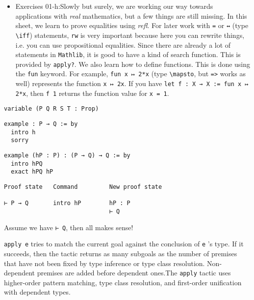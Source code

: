 \documentclass{memoir}
\begin{document}
\begin{itemize}
\item Exercises 01-h:Slowly but surely, we are working our way towards applications with \emph{real} mathematics, but a few things are still missing. In this sheet, we learn to prove equalities using \emph{refl}. For later work with \Verb|=| or \Verb|↔| (type \Verb|\iff|) statements, \Verb|rw| is very important because here you can rewrite things, i.e. you can use propositional equalities. Since there are already a lot of statements in \Verb|Mathlib|, it is good to have a kind of search function. This is provided by \Verb|apply?|. We also learn how to define functions. This is done using the \Verb|fun| keyword. For example, \Verb|fun x ↦ 2*x| (type \Verb|\mapsto|, but \Verb|=>| works as well) represents the function \Verb|x ↦ 2x|. If you have \Verb|let f : X → X := fun x ↦ 2*x|, then \Verb|f 1| returns the function value for \Verb|x = 1|.
\end{itemize}


\begin{verbatim}
variable (P Q R S T : Prop)

\end{verbatim}



\begin{verbatim}
example : P → Q := by
  intro h
  sorry

\end{verbatim}



\begin{verbatim}
example (hP : P) : (P → Q) → Q := by
  intro hPQ
  exact hPQ hP

\end{verbatim}



\begin{verbatim}
Proof state   Command         New proof state

⊢ P → Q       intro hP        hP : P
                              ⊢ Q

\end{verbatim}


Assume we have \Verb|⊢ Q|, then all makes sense!

\Verb|apply e|
 tries to match the current goal against the conclusion of \Verb|e|
's type.
If it succeeds, then the tactic returns as many subgoals as the number of premises that
have not been fixed by type inference or type class resolution.
Non-dependent premises are added before dependent ones.The \Verb|apply|
 tactic uses higher-order pattern matching, type class resolution,
and first-order unification with dependent types.
\end{document}
